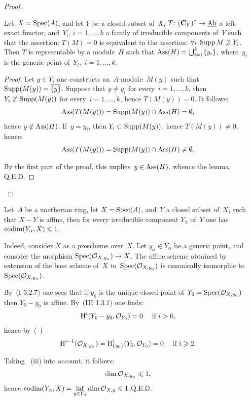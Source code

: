 \begin{proof}
\begin{lemma} \label{V.3.3} Let~$X=\operatorname{Spec}(A)$, and let $Y$ be a closed subset of~$X$, $T\colon (\CC_{Y})^{\circ}\to\Ab$ a left exact functor, and~$Y_{i}$, $i=1,\dots, k$ a family of irreducible components of~$Y$ such that the assertion: $T(M)=0$ is equivalent to the assertion: $\forall i\;\operatorname{Supp} M\not\supset Y_{i}$. Then $T$ is representable by a module~$H$ such that $\operatorname{Ass}(H)=\bigcup_{i=1}^{k}\{y_{i}\}$, where~$y_{i}$ is the generic point of~$Y_{i}$,~$i=1,\dots, k$.
\end{lemma}

\begin{proof}
Let $y\in Y$, one constructs an~$A$-module~$M(y)$ such that $\operatorname{Supp}(M(y))=\overline{\{ y\} }$. Suppose that $y\neq y_{i}$ for every~$i=1,\dots, k$, then $Y_{i}\not\subset\operatorname{Supp}(M(y))$ for every~$i=1,\dots, k$, hence $T(M(y))=0$. It follows:
\[
\operatorname{Ass}(T(M(y)))=\operatorname{Supp}(M(y))\cap\operatorname{Ass} (H)=\emptyset,
\]
hence $y\not\in\operatorname{Ass} (H)$. If~$y=y_{i}$, then $Y_{i}\subset\operatorname{Supp}(M(y))$, hence $T(M(y))\neq 0$, hence:
\[
\operatorname{Ass}(T(M(y)))=\operatorname{Supp}(M(y))\cap\operatorname{Ass} (H)\neq\emptyset.
\]

By the first part of the proof, this implies~$y\in\operatorname{Ass} (H)$, whence the lemma, \hfill Q.E.D.
\skipqed
\end{proof}
\skipqed
\end{proof}

\begin{example} \label{V.3.4}
Let~$A$ be a noetherian ring, let $X=\operatorname{Spec}(A)$, and~$Y$ a closed subset of~$X$, such that $X-Y$ is affine, then for every irreducible component $Y_{\alpha}$ of~$Y$ one has $\operatorname{codim}(Y_{\alpha}, X)\leqslant 1$.

Indeed, consider $X$ as a prescheme over~$X$. Let $y_{\alpha}\in Y_{\alpha}$ be a generic point, and consider the morphism $\Spec(\Oo_{X, y_{\alpha}})\to X$. The affine scheme obtained by extension of the base scheme of~$X$ to~$\operatorname{Spec}({\mathcal O}_{X, y_{\alpha}})$ is canonically isomorphic to~$\operatorname{Spec}({\mathcal O}_{X, y_{\alpha}})$.

By~(\EGA I 3.2.7) one sees that if $y_{0}$ is the unique closed point of~$Y_{0}=\operatorname{Spec}({\mathcal O}_{X, y_{\alpha}})$ then $Y_{0}- y_{0}$ is affine. By~(\EGA III 1.3.1) one finds:
\[
\operatorname{H}^{i}(Y_{0}- y_{0}, {\mathcal O}_{Y_{0}})=0\quad\textrm{ if }i>0,
\]
hence by~(~)
\[
\operatorname{H}^{i-1}({\mathcal O}_{X, y_{\alpha}})=\operatorname{H}_{\{ y_{0}\} }^{i}(Y_{0}, {\mathcal O}_{Y_{0}})=0\quad\textrm{ if }i\geqslant 2.
\]

Taking~ (iii) into account, it follows:
\[
\dim{\mathcal O}_{X, y_{\alpha}}\leqslant 1,
\]
hence $\operatorname{codim} (Y_{\alpha}, X)=\underset{y\in Y_{\alpha}}{\inf}\dim {\mathcal O}_{X, y}\leqslant 1$,\hfill Q.E.D.
\end{example}

